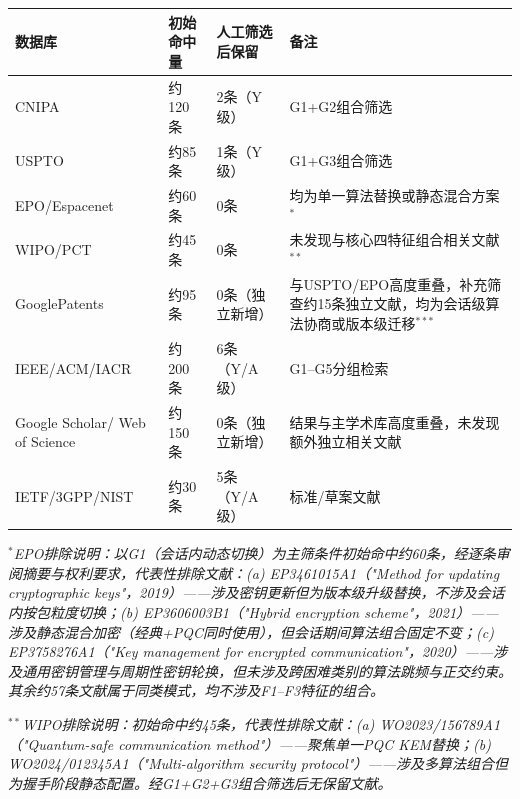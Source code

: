 ﻿\documentclass[12pt,a4paper]{article}
\begin{document}
\renewcommand{\arraystretch}{1.3}
\small
\begin{tabular}{|p{3.5cm}|p{3.5cm}|p{3.5cm}|p{3.5cm}|}
\hline
\textbf{数据库} & \textbf{初始命中量} & \textbf{人工筛选后保留} & \textbf{备注} \\
\hline
CNIPA & 约120条 & 2条（Y级） & G1+G2组合筛选 \\
\hline
USPTO & 约85条 & 1条（Y级） & G1+G3组合筛选 \\
\hline
EPO/\newline Espacenet & 约60条 & 0条 & 均为单一算法替换或静态混合方案$^*$ \\
\hline
WIPO/PCT & 约45条 & 0条 & 未发现与核心四特征组合相关文献$^{**}$ \\
\hline
Google\newline Patents & 约95条 & 0条（独立新增） & 与USPTO/EPO高度重叠，补充筛查约15条独立文献，均为会话级算法协商或版本级迁移$^{***}$ \\
\hline
IEEE/\newline ACM/\newline IACR & 约200条 & 6条（Y/A级） & G1--G5分组检索 \\
\hline
Google Scholar\newline / Web of Science & 约150条 & 0条（独立新增） & 结果与主学术库高度重叠，未发现额外独立相关文献 \\
\hline
IETF/\newline 3GPP/\newline NIST & 约30条 & 5条（Y/A级） & 标准/草案文献 \\
\hline
\end{tabular}
\normalsize

\vspace{0.3em}
\noindent\textit{$^*$EPO排除说明：以G1（会话内动态切换）为主筛条件初始命中约60条，经逐条审阅摘要与权利要求，代表性排除文献：(a) EP3461015A1（"Method for updating cryptographic keys"，2019）——涉及密钥更新但为版本级升级替换，不涉及会话内按包粒度切换；(b) EP3606003B1（"Hybrid encryption scheme"，2021）——涉及静态混合加密（经典+PQC同时使用），但会话期间算法组合固定不变；(c) EP3758276A1（"Key management for encrypted communication"，2020）——涉及通用密钥管理与周期性密钥轮换，但未涉及跨困难类别的算法跳频与正交约束。其余约57条文献属于同类模式，均不涉及F1--F3特征的组合。}

\noindent\textit{$^{**}$WIPO排除说明：初始命中约45条，代表性排除文献：(a) WO2023/156789A1（"Quantum-safe communication method"）——聚焦单一PQC KEM替换；(b) WO2024/012345A1（"Multi-algorithm security protocol"）——涉及多算法组合但为握手阶段静态配置。经G1+G2+G3组合筛选后无保留文献。}
\end{document}
